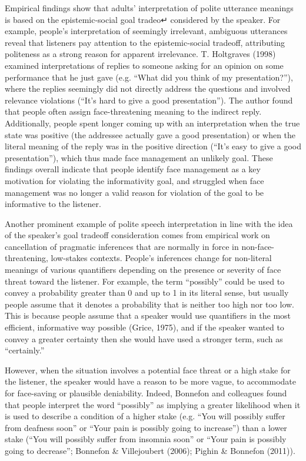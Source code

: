 \documentclass[oneside]{report}
\begin{document}
Empirical findings show that adults' interpretation of polite utterance
meanings is based on the epistemic-social goal tradeo↵ considered by the
speaker. For example, people's interpretation of seemingly irrelevant,
ambiguous utterances reveal that listeners pay attention to the
epistemic-social tradeoff, attributing politeness as a strong reason for
apparent irrelevance. T. Holtgraves (1998) examined interpretations of
replies to someone asking for an opinion on some performance that he
just gave (e.g. ``What did you think of my presentation?''), where the
replies seemingly did not directly address the questions and involved
relevance violations (``It's hard to give a good presentation''). The
author found that people often assign face-threatening meaning to the
indirect reply. Additionally, people spent longer coming up with an
interpretation when the true state was positive (the addressee actually
gave a good presentation) or when the literal meaning of the reply was
in the positive direction (``It's easy to give a good presentation''),
which thus made face management an unlikely goal. These findings overall
indicate that people identify face management as a key motivation for
violating the informativity goal, and struggled when face management was
no longer a valid reason for violation of the goal to be informative to
the listener.

Another prominent example of polite speech interpretation in line with
the idea of the speaker's goal tradeoff consideration comes from
empirical work on cancellation of pragmatic inferences that are normally
in force in non-face-threatening, low-stakes contexts. People's
inferences change for non-literal meanings of various quantifiers
depending on the presence or severity of face threat toward the
listener. For example, the term ``possibly'' could be used to convey a
probability greater than 0 and up to 1 in its literal sense, but usually
people assume that it denotes a probability that is neither too high nor
too low. This is because people assume that a speaker would use
quantifiers in the most efficient, informative way possible (Grice,
1975), and if the speaker wanted to convey a greater certainty then she
would have used a stronger term, such as ``certainly.''

However, when the situation involves a potential face threat or a high
stake for the listener, the speaker would have a reason to be more
vague, to accommodate for face-saving or plausible deniability. Indeed,
Bonnefon and colleagues found that people interpret the word
``possibly'' as implying a greater likelihood when it is used to
describe a condition of a higher stake (e.g. ``You will possibly suffer
from deafness soon'' or ``Your pain is possibly going to increase'')
than a lower stake (``You will possibly suffer from insomnia soon'' or
``Your pain is possibly going to decrease''; Bonnefon \& Villejoubert
(2006); Pighin \& Bonnefon (2011)).
\end{document}
